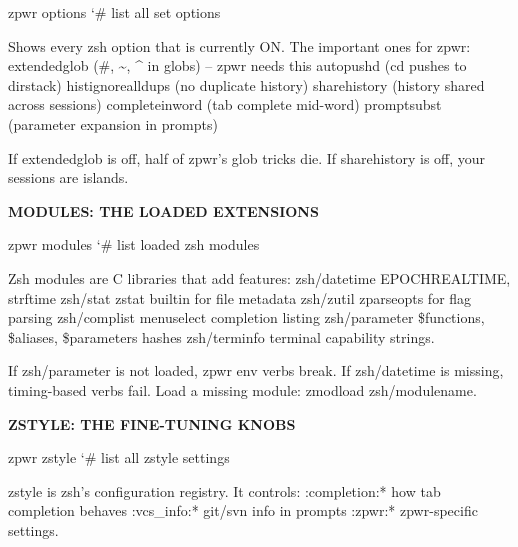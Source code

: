 \documentclass[11pt,a4paper,twoside]{book}
\begin{document}
\begin{codebox}
\color{neongreen}zpwr options                        {\char`\#} list all set options\\
\end{codebox}

Shows every zsh option that is currently ON. The important ones for zpwr: extendedglob      (\#, \textasciitilde{}, \textasciicircum{} in globs)  -- zpwr needs this autopushd         (cd pushes to dirstack) histignorealldups (no duplicate history) sharehistory      (history shared across sessions) completeinword    (tab complete mid-word) promptsubst       (parameter expansion in prompts)

If extendedglob is off, half of zpwr's glob tricks die. If sharehistory is off, your sessions are islands.


\vspace{12pt}
{\bfseries\color{neonyellow} MODULES: THE LOADED EXTENSIONS}\vspace{4pt}

\begin{codebox}
\color{neongreen}zpwr modules                        {\char`\#} list loaded zsh modules\\
\end{codebox}

Zsh modules are C libraries that add features: zsh/datetime      EPOCHREALTIME, strftime zsh/stat          zstat builtin for file metadata zsh/zutil         zparseopts for flag parsing zsh/complist       menuselect completion listing zsh/parameter      \$functions, \$aliases, \$parameters hashes zsh/terminfo       terminal capability strings.

If zsh/parameter is not loaded, zpwr env verbs break. If zsh/datetime is missing, timing-based verbs fail. Load a missing module: zmodload zsh/modulename.


\vspace{12pt}
{\bfseries\color{neonyellow} ZSTYLE: THE FINE-TUNING KNOBS}\vspace{4pt}

\begin{codebox}
\color{neongreen}zpwr zstyle                         {\char`\#} list all zstyle settings\\
\end{codebox}

zstyle is zsh's configuration registry. It controls: :completion:*     how tab completion behaves :vcs\_info:*       git/svn info in prompts :zpwr:*           zpwr-specific settings.
\end{document}
